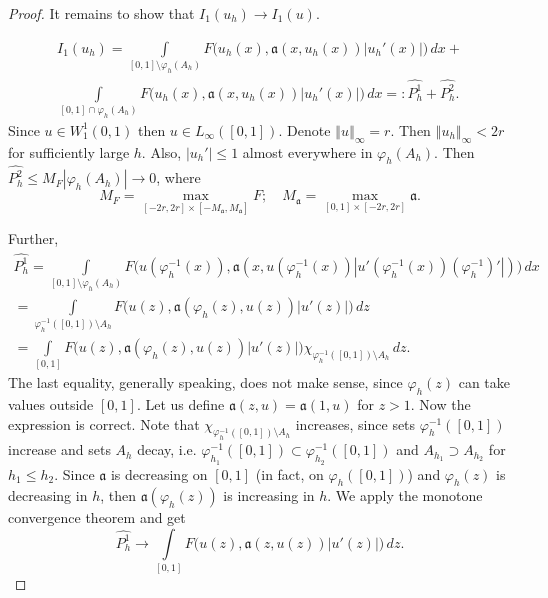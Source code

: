 \documentclass[12pt]{article}
\newcommand{\norm}[1]{\left\Vert#1\right\Vert}
\newcommand{\abs}[1]{\left\vert#1\right\vert}
\renewcommand{\phi}{\varphi}
\renewcommand{\le}{\leqslant}
\newcommand{\W}{W_1^1}
\begin{document}
\begin{proof}
It remains to show that $I_1( u_h ) \to I_1( u )$.

\begin{multline*}
I_1( u_h ) = \int\limits_{[0, 1] \setminus \phi_h( A_h )} F\big( u_h( x ), \mathfrak a( x, u_h(x) ) |u_h'( x )| \big) \, dx +\\
\int\limits_{[0, 1] \cap \phi_h( A_h )} F\big( u_h( x ), \mathfrak a( x, u_h(x) ) |u_h'( x )| \big) \, dx =: \hat{P_h^1} + \hat{P_h^2}.
\end{multline*}
Since $u \in \W(0, 1)$ then $u \in L_\infty( [0, 1] )$.
Denote $\norm{u}_\infty = r$.
Then $\norm{u_h}_\infty < 2r$ for sufficiently large $h$.
Also, $\abs{u_h'} \le 1$ almost everywhere in $\phi_h( A_h )$.
Then $\hat{P_h^2} \le M_F \abs{\phi_h( A_h )} \to 0$, where
$$M_F = \max\limits_{[-2r, 2r] \times [-M_{\mathfrak a}, M_{\mathfrak a}]} F;\quad M_{\mathfrak a} = \max\limits_{[0, 1] \times [-2r, 2r]} \mathfrak a.$$

Further,
\begin{multline*}
\hat{P_h^1} = \int\limits_{ [0, 1] \setminus \phi_h( A_h ) }
	F\big( u( \phi_h^{-1}( x ) ), \mathfrak a( x, u( \phi_h^{-1}( x ) ) |u'( \phi_h^{-1}( x ) ) ( \phi_h^{-1} )'| ) \big) \, dx
\\ =\int\limits_{ \phi_h^{-1}( [0, 1] ) \setminus A_h } F\big( u( z ), \mathfrak a( \phi_h( z ), u( z ) ) |u'( z )| \big) \, dz
\\ = \int\limits_{ [0, 1] } F\big( u( z ), \mathfrak a( \phi_h( z ), u( z ) ) |u'( z )| \big) \chi_{ \phi_h^{-1}( [0, 1] ) \setminus A_h } \, dz.
\end{multline*}
The last equality, generally speaking, does not make sense, since $\phi_h( z )$ can take values outside $[0, 1]$.
Let us define $\mathfrak a( z, u ) = \mathfrak a( 1, u )$ for $z > 1$. Now the expression is correct.
Note that $\chi_{\phi_h^{-1}( [0, 1] ) \setminus A_h}$ increases,
since sets $\phi_h^{-1}( [0, 1] )$ increase and sets $A_h$ decay,
i.e. $\phi_{h_1}^{-1}( [0, 1] ) \subset \phi_{h_2}^{-1}( [0, 1] )$ and $A_{h_1} \supset A_{h_2}$ for $h_1 \le h_2$.
Since $\mathfrak a$ is decreasing on $[0, 1]$ (in fact, on $\phi_h( [0, 1] )$) and $\phi_h( z )$ is decreasing in $h$,
then $\mathfrak a( \phi_h( z ) )$ is increasing in $h$.
We apply the monotone convergence theorem and get
$$\hat{P_h^1} \to \int\limits_{[0, 1]} F\big( u( z ), \mathfrak a( z, u( z ) ) |u'( z )| \big) \, dz.$$

\end{proof}
\end{document}
